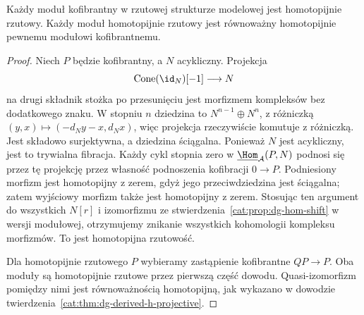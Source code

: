 \begin{lemat}\label{cat:lem:derived-dg-cofibrant-hp}
Każdy moduł kofibrantny w rzutowej strukturze modelowej jest homotopijnie rzutowy. Każdy moduł homotopijnie rzutowy jest równoważny homotopijnie pewnemu modułowi kofibrantnemu.
\end{lemat}
\begin{proof}
Niech $P$ będzie kofibrantny, a $N$ acykliczny. Projekcja
\[
 \operatorname{Cone}(\id_N)[-1]\longrightarrow N
\]
na drugi składnik stożka po przesunięciu jest morfizmem kompleksów bez dodatkowego znaku. W stopniu $n$ dziedzina to $N^{n-1}\oplus N^n$, z różniczką $(y,x)\mapsto(-d_Ny-x,d_Nx)$, więc projekcja rzeczywiście komutuje z różniczką. Jest składowo surjektywna, a dziedzina ściągalna. Ponieważ $N$ jest acykliczny, jest to trywialna fibracja. Każdy cykl stopnia zero w $\underline{\Hom}_{\mathcal A}(P,N)$ podnosi się przez tę projekcję przez własność podnoszenia kofibracji $0\to P$. Podniesiony morfizm jest homotopijny z zerem, gdyż jego przeciwdziedzina jest ściągalna; zatem wyjściowy morfizm także jest homotopijny z zerem. Stosując ten argument do wszystkich $N[r]$ i izomorfizmu ze stwierdzenia~\ref{cat:prop:dg-hom-shift} w wersji modułowej, otrzymujemy znikanie wszystkich kohomologii kompleksu morfizmów. To jest homotopijna rzutowość.

Dla homotopijnie rzutowego $P$ wybieramy zastąpienie kofibrantne $QP\to P$. Oba moduły są homotopijnie rzutowe przez pierwszą część dowodu. Quasi-izomorfizm pomiędzy nimi jest równoważnością homotopijną, jak wykazano w dowodzie twierdzenia~\ref{cat:thm:dg-derived-h-projective}.
\end{proof}

